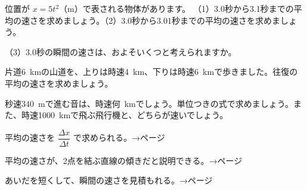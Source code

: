 
\bkproblem 位置が $x=5t^2$（m）で表される物体があります。
（1）3.0秒から3.1秒までの平均の速さを求めましょう。\quad（2）3.0秒から3.01秒までの平均の速さを求めましょう。\par
（3）3.0秒の瞬間の速さは、およそいくつと考えられますか。

\bkproblem 片道\qty{6}{km}の山道を、上りは時速\qty{4}{km}、下りは時速\qty{6}{km}で歩きました。往復の平均の速さを求めましょう。

\bkproblem 秒速\qty{340}{m}で進む音は、時速\mbox{何 km}でしょう。単位つきの式で求めましょう。また、時速\qty{1000}{km}で飛ぶ飛行機と、どちらが速いでしょう。

\begin{furikaeri}
\begin{checklist}
\item 平均の速さを $\dfrac{\Delta x}{\Delta t}$ で求められる。\hfill{\footnotesize\sffamily\color{bkTheme}→\pageref{bk:5-1:heikin}ページ}
\item 平均の速さが、2点を結ぶ直線の傾きだと説明できる。\hfill{\footnotesize\sffamily\color{bkTheme}→\pageref{bk:5-1:katamuki}ページ}
\item あいだを短くして、瞬間の速さを見積もれる。\hfill{\footnotesize\sffamily\color{bkTheme}→\pageref{bk:5-1:shunkan}ページ}
\end{checklist}
\end{furikaeri}


